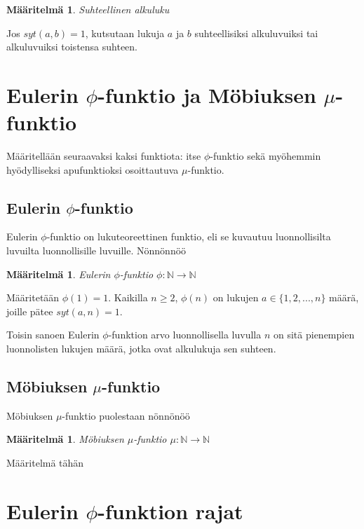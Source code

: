 \documentclass{article}
\theoremstyle{definition}
\newtheorem{maaritelma}[subsection]{Määritelmä}
\begin{document}
\begin{maaritelma}{\emph{Suhteellinen alkuluku}}

Jos $syt(a,b) = 1$, kutsutaan lukuja $a$ ja $b$ suhteellisiksi alkuluvuiksi tai alkuluvuiksi toistensa suhteen.

\end{maaritelma}

\section{Eulerin $\phi$-funktio ja Möbiuksen $\mu$-funktio}

Määritellään seuraavaksi kaksi funktiota: itse $\phi$-funktio sekä myöhemmin hyödylliseksi apufunktioksi osoittautuva $\mu$-funktio.

\subsection{Eulerin $\phi$-funktio}

Eulerin $\phi$-funktio on lukuteoreettinen funktio, eli se kuvautuu luonnollisilta luvuilta luonnollisille luvuille. Nönnönnöö

\begin{maaritelma}{\emph{Eulerin $\phi$-funktio $\phi: \mathbb{N} \rightarrow \mathbb{N}$}}

Määritetään $\phi(1) = 1$. Kaikilla $n \geq 2$, $\phi(n)$ on lukujen $a \in \{1,2,...,n\}$ määrä, joille pätee $syt(a,n) = 1$.

Toisin sanoen Eulerin $\phi$-funktion arvo luonnollisella luvulla $n$ on sitä pienempien luonnolisten lukujen määrä, jotka ovat alkulukuja sen suhteen.

\end{maaritelma}

\subsection{Möbiuksen $\mu$-funktio}

Möbiuksen $\mu$-funktio puolestaan nönnönöö

\begin{maaritelma}{\emph{Möbiuksen $\mu$-funktio $\mu: \mathbb{N} \rightarrow \mathbb{N}$}}

Määritelmä tähän

\end{maaritelma}

\section{Eulerin $\phi$-funktion rajat}
\end{document}
